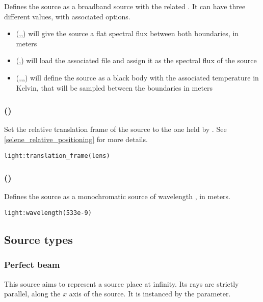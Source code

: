 Defines the source as a broadband source with the related . It can have three different values, with associated options.
\begin{itemize}
	\item {}(,,) will give the source a flat spectral flux between both boundaries, in meters
	\item {}(,) will load the associated file and assign it as the spectral flux of the source
	\item {}(,,,) will define the source as a black body with the associated temperature in Kelvin, that will be sampled between the boundaries in meters
\end{itemize}

\subsubsection[translation\_frame]{()}

Set the relative translation frame of the source to the one held by . See \ref{selene_relative_positioning} for more details.
\begin{lstlisting}
light:translation_frame(lens)
\end{lstlisting}

\subsubsection[wavelength]{()}

Defines the source as a monochromatic source of wavelength , in meters.
\begin{lstlisting}
light:wavelength(533e-9)
\end{lstlisting}

\subsection{Source types}

\subsubsection{Perfect beam}

This source aims to represent a source place at infinity. Its rays are strictly parallel, along the $x$ axis of the source. It is instanced by the  parameter.

